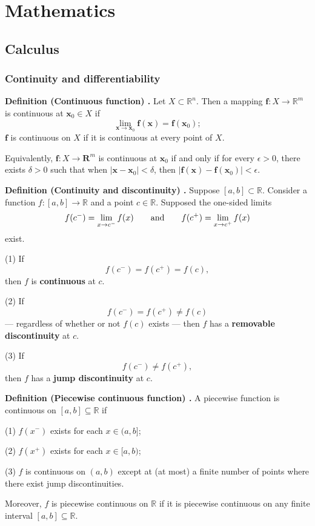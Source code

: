 \chapter{Mathematics}
\section{Calculus}

\subsection{Continuity and differentiability}

\begin{shaded}
\textbf{Definition (Continuous function) \cite{hubbard_hubbard}.} Let $X \subset \mathbb{R}^n$. Then a mapping $\mathbf{f} : X \to \mathbb{R}^m$ is continuous at $\mathbf{x}_0 \in X$ if
$$ \lim_{\mathbf{x} \to \mathbf{x}_0} \mathbf{f}(\mathbf{x}) = \mathbf{f}(\mathbf{x}_0); $$
$\mathbf{f}$ is continuous on $X$ if it is continuous at every point of $X$.

Equivalently, $\mathbf{f}: X \to \mathbf{R}^m$ is continuous at $\mathbf{x}_0$ if and only if for every $\epsilon > 0$, there exists $\delta > 0$ such that when $|\mathbf{x} - \mathbf{x}_0| < \delta$, then $|\mathbf{f}(\mathbf{x}) - \mathbf{f}(\mathbf{x}_0)| < \epsilon$.
\end{shaded}

\begin{shaded}
\textbf{Definition (Continuity and discontinuity) \cite{math2111_notes}.} Suppose $[a, b] \subset \mathbb{R}$. Consider a function $f : [a, b] \to \mathbb{R}$ and a point $c \in \mathbb{R}$. Supposed the one-sided limits
$$ f(c^-) = \lim_{x \to c^-} f(x) \qquad \textnormal{and} \qquad f(c^+) = \lim_{x \to c^+} f(x) $$
exist.

(1) If
$$ f(c^-) = f(c^+) = f(c) , $$
then $f$ is \textbf{continuous} at $c$.

(2) If
$$ f(c^-) = f(c^+) \not= f(c) $$
--- regardless of whether or not $f(c)$ exists --- then $f$ has a \textbf{removable discontinuity} at $c$.

(3) If
$$ f(c^-) \not= f(c^+) , $$
then $f$ has a \textbf{jump discontinuity} at $c$.
\end{shaded}

\begin{shaded}
\textbf{Definition (Piecewise continuous function) \cite{math2111_notes}.} A piecewise function is continuous on $[a, b] \subseteq \mathbb{R}$ if

(1) $f(x^-)$ exists for each $x \in (a, b]$;

(2) $f(x^+)$ exists for each $x \in [a, b)$;

(3) $f$ is continuous on $(a, b)$ except at (at most) a finite number of points where there exist jump discontinuities.

Moreover, $f$ is piecewise continuous on $\mathbb{R}$ if it is piecewise continuous on any finite interval $[a, b] \subseteq \mathbb{R}$.
\end{shaded}

